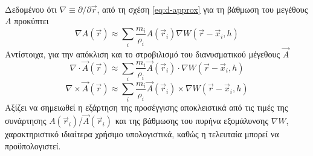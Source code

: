 \paragraph{} Δεδομένου ότι $\nabla \equiv \partial/\partial\vec{r}$,
από τη σχέση \ref{eq:d-approx} για τη βάθμωση του μεγέθους $A$ προκύπτει
\begin{equation}
  \label{eq:d-grad}
  \nabla A(\vec{r}) \approx \sum_i \frac{m_i}{\rho_i} A(\vec{r}_i) \nabla W(\vec{r} - \vec{x}_i, h)
\end{equation}
Αντίστοιχα, για την απόκλιση και το στροβιλισμό του διανυσματικού μέγεθους $\vec{A}$
\begin{equation}
  \label{eq:d-div}
  \nabla \cdot \vec{A}(\vec{r}) \approx \sum_i \frac{m_i}{\rho_i} \vec{A}(\vec{r}_i)
  \cdot \nabla W(\vec{r} - \vec{x}_i, h)
\end{equation}
\begin{equation}
  \label{eq:d-curl}
  \nabla \times \vec{A}(\vec{r}) \approx \sum_i \frac{m_i}{\rho_i} \vec{A}(\vec{r}_i)
  \times \nabla W(\vec{r} - \vec{x}_i, h)
\end{equation}
Αξίζει να σημειωθεί η εξάρτηση της προσέγγισης αποκλειστικά από τις τιμές της συνάρτησης
$A(\vec{r}_i)$/$\vec{A}(\vec{r}_i)$
και της βάθμωσης του πυρήνα εξομάλυνσης $\nabla W$,
χαρακτηριστικό ιδιαίτερα χρήσιμο υπολογιστικά, καθώς η τελευταία μπορεί να
προϋπολογιστεί.

